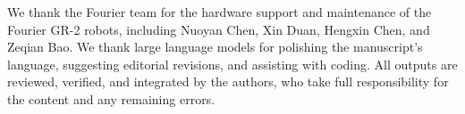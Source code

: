 We thank the Fourier team for the hardware support and maintenance of the Fourier GR-2 robots, including Nuoyan Chen, Xin Duan, Hengxin Chen, and Zeqian Bao. We thank large language models for polishing the manuscript’s language, suggesting editorial revisions, and assisting with coding. All outputs are reviewed, verified, and integrated by the authors, who take full responsibility for the content and any remaining errors.
